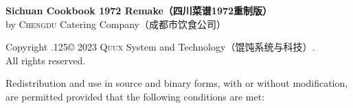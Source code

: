 %
%
%
%
%
%
%
\begingroup%

\newcommand\XeLaTeX{%
	X\kern-.1em\lower.5ex\hbox{\scalebox{-1}[1]{E}}\kern-.15em%
	L\kern-.36em\raise.428571ex\hbox{\scalefont{.7}{A}}\kern-.15em%
	T\kern-.166667em\lower.5ex\hbox{E}\kern-.125em{X}%
}

\footnotesize%
\singlespacing%
\setlength{\parindent}{0pt}%
\setlength{\parskip}{.1875\baselineskip}%
{\sffamily\bfseries Sichuan Cookbook 1972 Remake\!（四川菜谱1972重制版）}\\%
by \textsc{Chengdu} Catering Company\!（成都市饮食公司）

\null

Copyright {\lower.125\baselineskip\hbox{\copyright}} 2023
\textsc{Quux} System and Technology\!（馄饨系统与科技）\!\!\!.\\%
All rights reserved.

Redistribution and use in source and binary forms, with or without
modification, are permitted provided that the following conditions are met:

